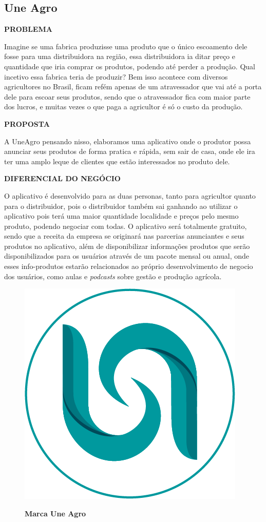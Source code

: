 \subsection{Une Agro}

\textbf{PROBLEMA}

Imagine se uma fabrica produzisse uma produto que o único escoamento dele fosse para uma distribuidora na região, essa distribuidora ia ditar preço e quantidade que iria comprar os produtos, podendo até perder a produção. Qual incetivo essa fabrica teria de produzir? Bem isso acontece com diversos agricultores no Brasil, ficam refém apenas de um atravessador que vai até a porta dele para escoar seus produtos, sendo que o atravessador fica com maior parte dos lucros, e muitas vezes o que paga a agricultor é só o custo da produção.

\textbf{PROPOSTA}

A UneAgro pensando nisso, elaboramos uma aplicativo onde o produtor possa anunciar seus produtos de forma pratica e rápida, sem sair de casa, onde ele ira ter uma amplo leque de clientes que estão interessados no produto dele.

\textbf{DIFERENCIAL DO NEGÓCIO}

O aplicativo é desenvolvido para as duas personas, tanto para agricultor quanto para o distribuidor, pois o distribuidor também sai ganhando ao utilizar o aplicativo pois terá uma maior quantidade localidade e preços pelo mesmo produto, podendo negociar com todas. O aplicativo será totalmente gratuito, sendo que a receita da empresa se originará nas parcerias anunciantes e seus produtos no aplicativo, além de disponibilizar informações produtos que serão disponibilizados para os usuários através de um pacote mensal ou anual, onde esses info-produtos estarão relacionados ao próprio desenvolvimento de negocio dos usuários, como aulas e \textit{podcasts} sobre gestão e produção agrícola.

\begin{figure}[!htb]
\centering
\caption{\textbf{Marca Une Agro}}
\includegraphics[scale=1.5]{Imagens/uneagro.png}
\label{figura_28}
\end{figure}
\newpage

